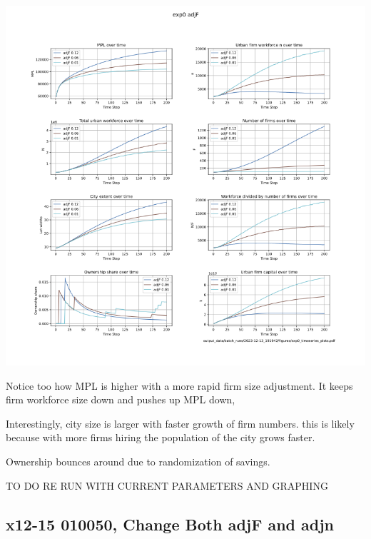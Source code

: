\includegraphics[scale=.55]{fig/Analysis/AdjF.png}

Notice too how MPL  is higher with a more rapid firm size adjustment. It keeps  firm workforce size down and pushes up MPL down, 

  Interestingly, city size is larger with faster growth of firm numbers. this is likely because with more firms hiring the population of the city grows faster.

  Ownership bounces around due to randomization of savings.


TO DO RE RUN WITH CURRENT PARAMETERS AND GRAPHING
\newpage


 \subsection{x12-15 010050, Change  Both adjF and adjn}

